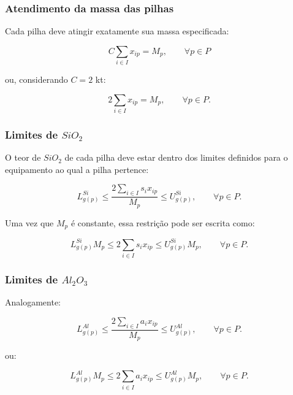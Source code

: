 \documentclass[12pt,a4paper]{article}
\begin{document}
\subsubsection{Atendimento da massa das pilhas}

Cada pilha deve atingir exatamente sua massa especificada:

\begin{equation}
\boxed{
C\sum_{i\in I}x_{ip}=M_p,
\qquad
\forall p\in P
}
\end{equation}

ou, considerando $C=2$ kt:

\begin{equation}
\boxed{
2\sum_{i\in I}x_{ip}=M_p,
\qquad
\forall p\in P.
}
\end{equation}


\subsubsection{Limites de $SiO_2$}

O teor de $SiO_2$ de cada pilha deve estar dentro dos limites definidos
para o equipamento ao qual a pilha pertence:

\begin{equation}
\boxed{
L_{g(p)}^{Si}
\leq
\frac{
2\sum_{i\in I}s_i x_{ip}
}{
M_p
}
\leq
U_{g(p)}^{Si},
\qquad
\forall p\in P.
}
\end{equation}

Uma vez que $M_p$ é constante, essa restrição pode ser escrita como:

\begin{equation}
\boxed{
L_{g(p)}^{Si} M_p
\leq
2\sum_{i\in I}s_i x_{ip}
\leq
U_{g(p)}^{Si} M_p,
\qquad
\forall p\in P.
}
\end{equation}


\subsubsection{Limites de $Al_2O_3$}

Analogamente:

\begin{equation}
\boxed{
L_{g(p)}^{Al}
\leq
\frac{
2\sum_{i\in I}a_i x_{ip}
}{
M_p
}
\leq
U_{g(p)}^{Al},
\qquad
\forall p\in P.
}
\end{equation}

ou:

\begin{equation}
\boxed{
L_{g(p)}^{Al}M_p
\leq
2\sum_{i\in I}a_i x_{ip}
\leq
U_{g(p)}^{Al}M_p,
\qquad
\forall p\in P.
}
\end{equation}
\end{document}
